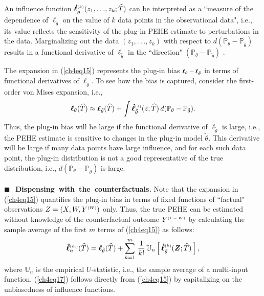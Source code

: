 \documentclass [PhD] {uclathes}
\begin{document}
An influence function \mbox{\footnotesize $\boldsymbol{\dot{\ell}}^{\mbox{\tiny $(k)$}}_{\tilde{\theta}}(z_1,.\,.\,.,z_k;\widehat{T})$} can be interpreted as a ``measure of the dependence of \mbox{\footnotesize $\boldsymbol{\ell}_{\tilde{\theta}}$} on the value of \mbox{\footnotesize $k$} data points in the observational data", i.e., its value reflects the sensitivity of the plug-in PEHE estimate to perturbations in the data. Marginalizing out the data \mbox{\footnotesize $(z_1,.\,.\,.,z_k)$} with respect to \mbox{\footnotesize $d(\mathbb{P}_{\theta}-\mathbb{P}_{\tilde{\theta}})$} results in a functional derivative of \mbox{\footnotesize $\boldsymbol{\ell}_{\tilde{\theta}}$} in the ``direction" \mbox{\footnotesize $(\mathbb{P}_{\theta}-\mathbb{P}_{\tilde{\theta}})$} \cite{robins2017minimax}.

The expansion in (\ref{ch4eq15}) represents the plug-in bias $\mbox{\footnotesize $\boldsymbol{\ell}_{\theta}-\boldsymbol{\ell}_{\tilde{\theta}}$}$ in terms of functional derivatives of \mbox{\footnotesize $\boldsymbol{\ell}_{\tilde{\theta}}$}. To see how the bias is captured, consider the first-order von Mises expansion, i.e.,
\begin{align}
\boldsymbol{\ell}_{\theta}(\widehat{T}) \approx \boldsymbol{\ell}_{\tilde{\theta}}(\widehat{T}) + \int \boldsymbol{\dot{\ell}}^{\mbox{\tiny $(1)$}}_{\tilde{\theta}}(z;\widehat{T})\, d(\mathbb{P}_{\theta}-\mathbb{P}_{\tilde{\theta}}). 
\label{ch4eq16}
\end{align}
Thus, the plug-in bias will be large if the functional derivative of \mbox{\footnotesize $\boldsymbol{\ell}_{\tilde{\theta}}$} is large, i.e., the PEHE estimate is sensitive to changes in the plug-in model \mbox{\footnotesize $\tilde{\theta}$}. This derivative will be large if many data points have large influence, and for each such data point, the plug-in distribution is not a good representative of the true distribution, i.e., \mbox{\footnotesize $d(\mathbb{P}_{\theta}-\mathbb{P}_{\tilde{\theta}})$} is large.\\ 
\\
{\bf \mbox{\tiny $\blacksquare$}\,~Dispensing~with~the~counterfactuals.} Note that the expansion in (\ref{ch4eq15}) quantifies the plug-in bias in terms of fixed functions of ``factual" observations \mbox{\footnotesize $Z = (X,W,Y^{\mbox{\tiny $(W)$}})$} only. Thus, the true PEHE can be estimated without knowledge of the counterfactual outcome \mbox{\footnotesize $Y^{\mbox{\tiny $(1-W)$}}$} by calculating the sample average of the first \mbox{\footnotesize $m$} terms of (\ref{ch4eq15}) as follows:
\begin{align}
\boldsymbol{\hat{\ell}}^{\mbox{\tiny $(m)$}}_n(\widehat{T}) = \boldsymbol{\ell}_{\tilde{\theta}}(\widehat{T}) + \sum_{k=1}^m\,\frac{1}{k!}\,\mathbb{U}_{n}\left[\,\boldsymbol{\dot{\ell}}^{\mbox{\tiny $(k)$}}_{\tilde{\theta}}(\boldsymbol{Z};\widehat{T})\,\right], 
\label{ch4eq17}
\end{align} 
where \mbox{\footnotesize $\mathbb{U}_n$} is the empirical \mbox{\footnotesize $U$}-statistic, i.e., the sample average of a multi-input function. (\ref{ch4eq17}) follows directly from (\ref{ch4eq15}) by capitalizing on the unbiasedness of influence functions.
\end{document}
